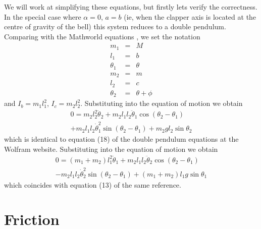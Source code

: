 \documentclass{article}
\begin{document}
We will work at simplifying these equations, but firstly lets verify the correctness.
In the special case where $\alpha=0$, $a=b$ (ie, when the clapper axis is located at the
centre of gravity of the bell) this system reduces to a double pendulum. 
Comparing with the Mathworld equations \cite{doublependulum}, we set the notation
\begin{equation}
\begin{array}{rcl}
m_1 &=& M \\
l_1 &=& b \\
\theta_1 &=& \theta \\
m_2 &=& m \\
l_2 &=& c \\
\theta_2 &=& \theta + \phi
\end{array}
\end{equation}
and $I_b = m_1 l_1^2$, $I_c = m_2 l_2^2$. 
Substituting into the equation of motion  we obtain
\begin{equation}
\begin{array}{c}
0 = m_2 l_2^2 \ddot{\theta}_2 + m_2 l_1 l_2 \ddot{\theta}_1 \cos(\theta_2 - \theta_1) \\
+ m_2 l_1 l_2 \dot{\theta}_1^2 \sin(\theta_2 - \theta_1)
+ m_2 g l_2 \sin \theta_2
\end{array}
\end{equation}
which is identical to equation (18) of the double pendulum equations at the Wolfram website.
Substituting into the equation of motion
 we obtain
\begin{equation}
\begin{array}{c}
0 = (m_1+m_2) l_1^2 \ddot{\theta}_1 + m_2 l_1 l_2 \ddot{\theta}_2 \cos(\theta_2 - \theta_1) \\
- m_2 l_1 l_2 \dot{\theta}_2^2 \sin(\theta_2 - \theta_1) + (m_1+m_2) l_1 g \sin \theta_1
\end{array}
\end{equation}
which coincides with equation (13) of the same reference.

\section{Friction}
\end{document}
